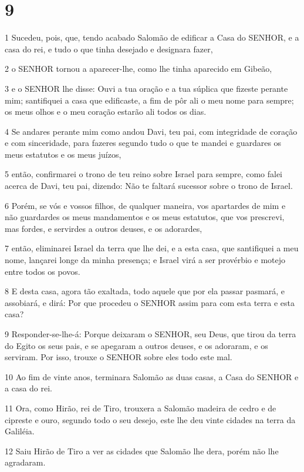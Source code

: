 \chapter{9}

\par 1 Sucedeu, pois, que, tendo acabado Salomão de edificar a Casa do SENHOR, e a casa do rei, e tudo o que tinha desejado e designara fazer,
\par 2 o SENHOR tornou a aparecer-lhe, como lhe tinha aparecido em Gibeão,
\par 3 e o SENHOR lhe disse: Ouvi a tua oração e a tua súplica que fizeste perante mim; santifiquei a casa que edificaste, a fim de pôr ali o meu nome para sempre; os meus olhos e o meu coração estarão ali todos os dias.
\par 4 Se andares perante mim como andou Davi, teu pai, com integridade de coração e com sinceridade, para fazeres segundo tudo o que te mandei e guardares os meus estatutos e os meus juízos,
\par 5 então, confirmarei o trono de teu reino sobre Israel para sempre, como falei acerca de Davi, teu pai, dizendo: Não te faltará sucessor sobre o trono de Israel.
\par 6 Porém, se vós e vossos filhos, de qualquer maneira, vos apartardes de mim e não guardardes os meus mandamentos e os meus estatutos, que vos prescrevi, mas fordes, e servirdes a outros deuses, e os adorardes,
\par 7 então, eliminarei Israel da terra que lhe dei, e a esta casa, que santifiquei a meu nome, lançarei longe da minha presença; e Israel virá a ser provérbio e motejo entre todos os povos.
\par 8 E desta casa, agora tão exaltada, todo aquele que por ela passar pasmará, e assobiará, e dirá: Por que procedeu o SENHOR assim para com esta terra e esta casa?
\par 9 Responder-se-lhe-á: Porque deixaram o SENHOR, seu Deus, que tirou da terra do Egito os seus pais, e se apegaram a outros deuses, e os adoraram, e os serviram. Por isso, trouxe o SENHOR sobre eles todo este mal.
\par 10 Ao fim de vinte anos, terminara Salomão as duas casas, a Casa do SENHOR e a casa do rei.
\par 11 Ora, como Hirão, rei de Tiro, trouxera a Salomão madeira de cedro e de cipreste e ouro, segundo todo o seu desejo, este lhe deu vinte cidades na terra da Galiléia.
\par 12 Saiu Hirão de Tiro a ver as cidades que Salomão lhe dera, porém não lhe agradaram.

